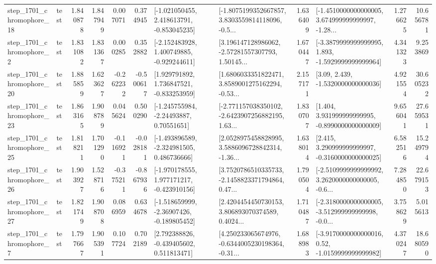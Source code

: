 \begin{tabular}{llrrrrllrlrr}
 step\_1701\_chromophore\_18 &      test &      1.840878 &    1.847949 &      0.007071 &  0.374945 &   [-1.021050455, 2.418613791, -0.853045235] &  [-1.8075199352667857, 3.8303559814118096, -0.5... &       1.636409 &  [-1.4510000000000005, 3.674999999999997, -1.28... &            1.276625 &         10.656781 \\
  step\_1701\_chromophore\_2 &      test &      1.831082 &    1.831367 &      0.000285 &  0.352882 &   [-2.152483928, 1.400749885, -0.929244611] &  [3.196147128986062, -2.57281557307793, 1.50145... &       1.670447 &  [-3.3879999999999995, 1.893, -1.5929999999999964] &            4.341323 &          9.253869 \\
 step\_1701\_chromophore\_20 &      test &      1.885859 &    1.623627 &     -0.262232 & -0.500617 &    [1.929791892, 1.736847521, -0.833253959] &  [1.6806033351822471, 3.8589001275162294, -0.53... &       2.157171 &                 [3.09, 2.439, -1.5320000000000036] &            4.921554 &         30.605232 \\
 step\_1701\_chromophore\_23 &      test &      1.863165 &    1.908789 &      0.045624 &  0.500290 &     [-1.245755984, -2.24493887, 0.70551651] &  [-2.771157038350102, -2.6423907256882195, 1.63... &       1.830707 &    [1.404, 3.931999999999995, -0.8990000000000009] &            9.656041 &         27.659531 \\
 step\_1701\_chromophore\_25 &      test &      1.818211 &    1.701290 &     -0.116921 & -0.028181 &   [-1.493896589, -2.324981505, 0.486736666] &  [2.0528975458828995, 3.5886096728842314, -1.36... &       1.638014 &    [2.415, 3.290999999999997, -0.3160000000000025] &            6.582516 &         15.249794 \\
 step\_1701\_chromophore\_26 &      test &      1.903927 &    1.528716 &     -0.375211 & -0.867936 &   [-1.970178555, 1.977171217, -0.423910156] &  [3.7520786510335733, -2.1458823371794864, 0.47... &       1.790504 &  [-2.5109999999999992, 3.2620000000000005, -0.6... &            7.284850 &         22.679153 \\
 step\_1701\_chromophore\_27 &      test &      1.821749 &    1.908708 &      0.086959 &  0.634678 &   [-1.518659999, -2.36907426, -0.189805452] &  [2.4204454450730153, 3.806893070374589, 0.4024... &       1.710487 &  [-2.3180000000000005, -3.512999999999998, -0.0... &            3.758629 &          5.015613 \\
  step\_1701\_chromophore\_7 &      test &      1.797667 &    1.905391 &      0.107724 &  0.702189 &    [2.792388826, -0.439405602, 0.511813471] &  [4.250233065674976, -0.6344005230198364, -0.31... &       1.688983 &   [-3.9170000000000016, 0.52, -1.0159999999999982] &            4.370247 &         18.680590 \\

\end{tabular}

